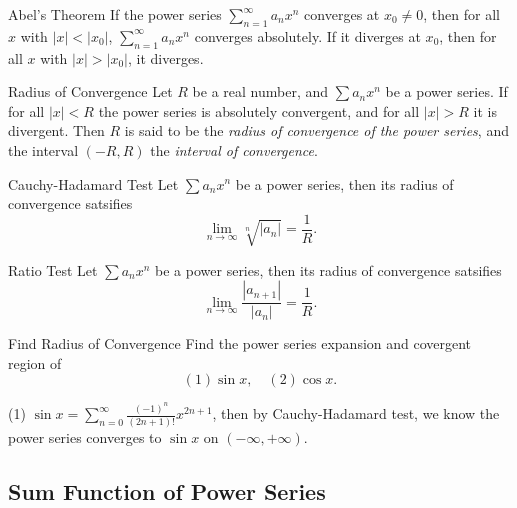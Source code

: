 \begin{theorem}{Abel's Theorem}{}
  If the power series $\sum\limits_{n = 1}^{\infty} a_nx^n$
  converges at $x_0 \neq 0$,
  then for all $x$ with $|x| < |x_0|$,
  $\sum\limits_{n = 1}^{\infty} a_nx^n$ converges absolutely.
  If it diverges at $x_0$,
  then for all $x$ with $|x| > |x_0|$, it diverges.
\end{theorem}

\begin{definition}{Radius of Convergence}{}
 Let $R$ be a real number, and $\sum a_nx^n$ be a power series.
 If for all $|x| < R$ the power series is absolutely convergent,
 and for all $|x| > R$ it is divergent.
 Then $R$ is said to be the \emph{radius of convergence of the power series},
 and the interval $(-R, R)$ the \emph{interval of convergence}.
\end{definition}

\begin{proposition}{Cauchy-Hadamard Test}{}
  Let $\sum a_nx^n$ be a power series, then its radius of convergence satsifies
  \begin{equation}
    \lim \limits _{n \rightarrow \infty} \sqrt[n]{|a_n|} = \frac{1}{R}.
  \end{equation}
\end{proposition}

\begin{proposition}{Ratio Test}{}
  Let $\sum a_nx^n$ be a power series, then its radius of convergence satsifies
  \begin{equation}
    \lim \limits _{n \rightarrow \infty} \frac{|a_{n+1}|}{|a_n|} = \frac{1}{R}.
  \end{equation}
\end{proposition}

\begin{example}{Find Radius of Convergence}{}
  Find the power series expansion and covergent region of
  \begin{equation}
    (1) \sin x, \quad
    (2) \cos x.
  \end{equation}
\end{example}

\begin{solution}
  (1) $\sin x = \sum\limits_{n = 0}^{\infty} \frac{(-1)^n}{(2n+1)!}x^{2n+1}$,
  then by Cauchy-Hadamard test, we know the power series converges to $\sin x$
  on $(-\infty, +\infty)$.
\end{solution}

\subsection{Sum Function of Power Series}

